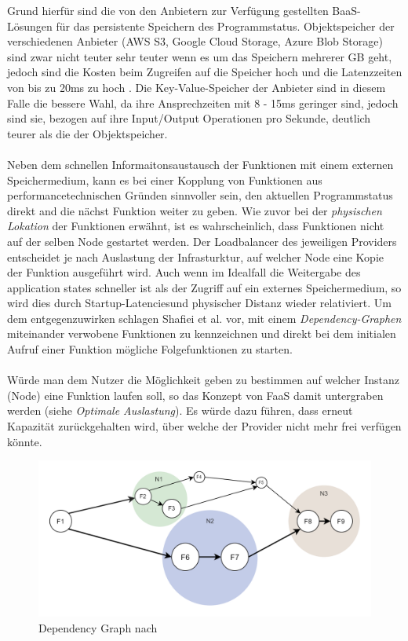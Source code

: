 \documentclass[11pt]{article}
\begin{document}
Grund hierfür sind die von den Anbietern zur Verfügung gestellten BaaS-Lösungen für das persistente Speichern des Programmstatus. Objektspeicher der verschiedenen Anbieter (AWS S3, Google Cloud Storage, Azure Blob Storage) sind zwar nicht teuter sehr teuter wenn es um das Speichern mehrerer GB geht, jedoch sind die Kosten beim Zugreifen auf die Speicher hoch und die Latenzzeiten von bis zu 20ms zu hoch \cite{jonas2019cloud}. Die Key-Value-Speicher der Anbieter sind in diesem Falle die bessere Wahl, da ihre Ansprechzeiten mit 8 - 15ms geringer sind, jedoch sind sie, bezogen auf ihre Input/Output Operationen pro Sekunde, deutlich teurer als die der Objektspeicher. \\\\
Neben dem schnellen Informaitonsaustausch der Funktionen mit einem externen Speichermedium, kann es bei einer Kopplung von Funktionen aus performancetechnischen Gründen sinnvoller sein, den aktuellen Programmstatus direkt and die nächst Funktion weiter zu geben. Wie zuvor bei der \textit{physischen Lokation} der Funktionen erwähnt, ist es wahrscheinlich, dass Funktionen nicht auf der selben Node gestartet werden. Der Loadbalancer des jeweiligen Providers entscheidet je nach Auslastung der Infrasturktur, auf welcher Node eine Kopie der Funktion ausgeführt wird. Auch wenn im Idealfall die Weitergabe des \glqq application states\grqq{} schneller ist als der Zugriff auf ein externes Speichermedium, so wird dies durch \glqq Startup-Latencies\grqq{}und physischer Distanz wieder relativiert. Um dem entgegenzuwirken schlagen Shaﬁei et al. \cite{shafiei2020serverless} vor, mit einem \textit{Dependency-Graphen} miteinander verwobene Funktionen zu kennzeichnen und direkt bei dem initialen Aufruf einer Funktion mögliche Folgefunktionen zu starten. \\\\
Würde man dem Nutzer die Möglichkeit geben zu bestimmen auf welcher Instanz (Node) eine Funktion laufen soll, so das Konzept von FaaS damit untergraben werden (siehe \textit{Optimale Auslastung}). Es würde dazu führen, dass erneut Kapazität zurückgehalten wird, über welche der Provider nicht mehr frei verfügen könnte. 
\begin{figure}[H]
\caption{Dependency Graph nach \cite{shafiei2020serverless}}
\label{fig:dependencyGraph}
\centering
\includegraphics[width=1\textwidth]{DependencyGraph}
\end{figure} 
\end{document}
